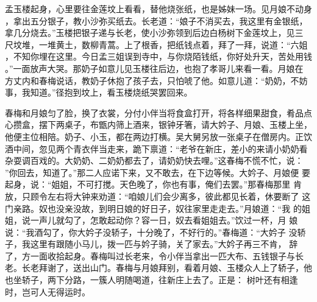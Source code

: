 孟玉楼起身，心里要往金莲坟上看看，替他烧张纸，也是姊妹一场。见月娘不动身
，拿出五分银子，教小沙弥买纸去。长老道：“娘子不消买去，我这里有金银纸，
拿几分烧去。”玉楼把银子递与长老，使小沙弥领到后边白杨树下金莲坟上，见三
尺坟堆，一堆黄土，数柳青蒿。上了根香，把纸钱点着，拜了一拜，说道：“六姐
，不知你埋在这里。今日孟三姐误到寺中，与你烧陌钱纸，你好处升天，苦处用钱
。”一面放声大哭。那奶子如意儿见玉楼往后边，也抱了孝哥儿来看一看。月娘在
方丈内和春梅说话，教奶子休抱了孩子去，只怕唬了他。如意儿道：“奶奶，不妨
事，我知道。”径抱到坟上，看玉楼烧纸哭罢回来。

春梅和月娘匀了脸，换了衣裳，分付小伴当将食盒打开，将各样细果甜食，肴品点
心攒盒，摆下两桌子，布甑内筛上酒来，银钟牙箸，请大妗子、月娘、玉楼上坐，
他便主位相陪。奶子、小玉，都在两边打横。吴大舅另放一张桌子在僧房内。正饮
酒中间，忽见两个青衣伴当走来，跪下禀道：“老爷在新庄，差小的来请小奶奶看
杂耍调百戏的。大奶奶、二奶奶都去了，请奶奶快去哩。”这春梅不慌不忙，说：
”你回去，知道了。”那二人应诺下来，又不敢去，在下边等候。大妗子、月娘便
要起身，说：“姐姐，不可打搅。天色晚了，你也有事，俺们去罢。”那春梅那里
肯放，只顾令左右将大钟来劝道：“咱娘儿们会少离多，彼此都见长着，休要断了
这门亲路。奴也没亲没故，到明日娘的好日子，奴往家里走走去。”月娘道：“我
的姐姐，说一声儿就勾了，怎敢起动你？容一日，奴去看姐姐去。”饮过一杯，月
娘说：“我酒勾了，你大妗子没轿子，十分晚了，不好行的。”春梅道：“大妗子
没轿子，我这里有跟随小马儿，拨一匹与妗子骑，关了家去。”大妗子再三不肯，
辞了，方一面收拾起身。春梅叫过长老来，令小伴当拿出一匹大布、五钱银子与长
老。长老拜谢了，送出山门。春梅与月娘拜别，看着月娘、玉楼众人上了轿子，他
也坐轿子，两下分路，一簇人明随喝道，往新庄上去了。正是：
树叶还有相逢时，岂可人无得运时。